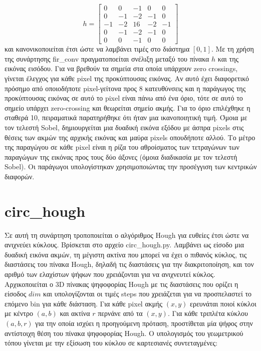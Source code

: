 \documentclass{article}
\begin{document}
\begin{equation}
h = \left[\begin{matrix}
        0& 0&-1& 0& 0 \\
        0&-1&-2&-1& 0 \\
       -1&-2&16&-2&-1 \\
        0&-1&-2&-1& 0 \\
        0& 0&-1& 0& 0 
    \end{matrix}\right]
\end{equation}
και κανονικοποιείται έτσι ώστε να λαμβάνει τιμές στο διάστημα $\left[0,1\right]$.
Με τη χρήση της συνάρτησης fir\_conv πραγματοποείται σνέλιξη μεταξύ του πίνακα
$h$ και της εικόνας εισόδου. Για να βρεθούν τα σημεία στα οποία υπάρχουν zero 
crossings, γίνεται έλεγχος για κάθε pixel της προκύπτουσας εικόνας. Αν αυτό έχει 
διαφορετικό πρόσημο από οποιοδήποτε pixel-γείτονα προς 8 κατευθύνσεις και η 
παράγωγος της προκύπτουσας εικόνας σε αυτό το
pixel είναι πάνω από ένα όριο, τότε σε αυτό το σημείο υπάρχει zero-crossing και 
θεωρείται σημείο ακμής. Για το όριο επιλέχθηκε η σταθερά 10, πειραματικά παρατηρήθηκε
ότι ήταν μια ικανοποιητική τιμή. Όμοια με τον τελεστή Sobel, δημιουργείται μια δυαδική 
εικόνα εξόδου με άσπρα pixels στις θέσεις των ακμών της αρχικής εικόνας και μαύρα 
pixels οπουδήποτε αλλού. Το μέτρο της παραγώγου σε κάθε pixel 
είναι η ρίζα του αθροίσματος των τετραγώνων των παραγώγων της εικόνας προς τους 
δύο άξονες (όμοια διαδικασία με τον τελεστή Sobel). Οι παράγωγοι υπολογίστηκαν 
χρησιμοποιώντας την προσέγγιση των κεντρικών διαφορών.

\section{circ\_hough}\label{hough}
Σε αυτή τη συνάρτηση τροποποιείται ο αλγόριθμος Hough για ευθείες 
έτσι ώστε να ανιχνεύει κύκλους. Βρίσκεται στο αρχείο circ\_hough.py.
Λαμβάνει ως είσοδο μια δυαδική εικόνα ακμών, τη μέγιστη ακτίνα 
που μπορεί να έχει ο πιθανός κύκλος, τις διαστάσεις του πίνακα Hough, δηλαδή
τις διαστάσεις για την διακριτοποίηση, και τον αριθμό των ελαχίστων 
ψήφων που χρειάζονται για να ανιχνευτεί κύκλος. Αρχι\-κο\-ποι\-είται ο 
3D πίνακας ψηφοφορίας Hough με τις διαστάσεις που ορίζει η είσοδος $dim$
και υπολογίζονται οι τιμές steps που χρειάζεται για να προσπελαστεί το επόμενο
bin για κάθε διάσταση. Για κάθε pixel ακμής $(x, y)$ ερευνάται ποιοί κύκλοι με
κέντρο $(a, b)$ και ακτίνα $r$ περνάνε από τα $(x, y)$. Για κάθε τριπλέτα 
κύκλου $(a, b, r)$ για την οποία ισχύει η προηγούμενη πρόταση, προστίθεται
μία ψήφος στην αντίστοιχη θέση του πίνακα ψηφοφορίας Hough. Ο
υπολογισμός του γεωμετρικού τόπου γίνεται με την εξίσωση του κύκλου σε
καρτεσιανές συντεταγμένες:
\end{document}
